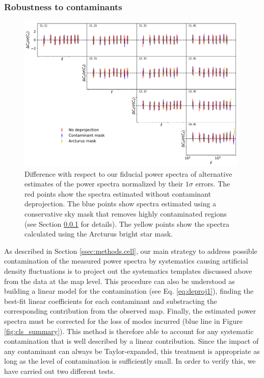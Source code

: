 \documentclass[a4paper,11pt]{article}
\begin{document}
    \subsubsection{Robustness to contaminants} \label{sssec:results.spectra.syst}
      \begin{figure}
        \centering
        \includegraphics[width=0.99\textwidth]{figures/cls_systematics.pdf}
        \caption{Difference with respect to our fiducial power spectra of alternative estimates of the power spectra normalized by their $1\sigma$ errors. The red points show the spectra estimated without contaminant deprojection. The blue points show spectra estimated using a conservative sky mask that removes highly contaminated regions (see Section \ref{sssec:results.spectra.syst} for details). The yellow points show the spectra calculated using the Arcturus bright star mask.}
        \label{fig:cls_systematics}
      \end{figure}
      As described in Section \ref{ssec:methods.cell}, our main strategy to address possible contamination of the measured power spectra by systematics causing artificial density fluctuations is to project out the systematics templates discussed above from the data at the map level. This procedure can also be understood as building a linear model for the contamination (see Eq. \ref{eq:deproj1}), finding the best-fit linear coefficients for each contaminant and substracting the corresponding contribution from the observed map. Finally, the estimated power spectra must be corrected for the loss of modes incurred (blue line in Figure \ref{fig:cls_summary}). This method is therefore able to account for any systematic contamination that is well described by a linear contribution. Since the impact of any contaminant can always be Taylor-expanded, this treatment is appropriate as long as the level of contamination is sufficiently small. In order to verify this, we have carried out two different tests.
      
\end{document}

